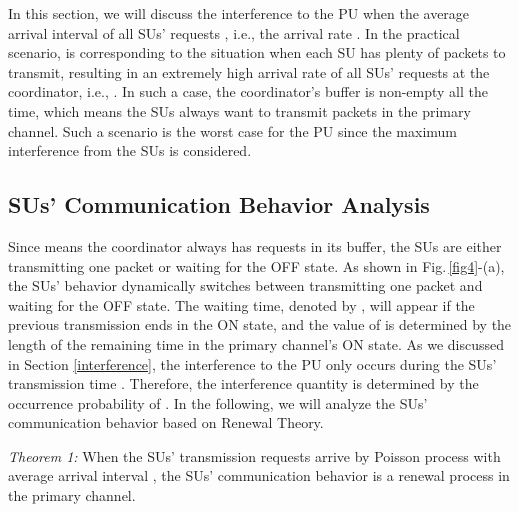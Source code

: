 \documentclass[11pt,draftcls]{IEEEtran}{\onecolumn}
\begin{document}
In this section, we will discuss the interference to the PU when the
average arrival interval of all SUs' requests , i.e.,
the arrival rate . In the practical
scenario,  is corresponding to the situation
when each SU has plenty of packets to transmit, resulting in an
extremely high arrival rate of all SUs' requests at the coordinator,
i.e., . In such a case, the
coordinator's buffer is non-empty all the time, which means the SUs
always want to transmit packets in the primary channel. Such a
scenario is the worst case for the PU since the maximum interference
from the SUs is considered.

\subsection{SUs' Communication Behavior Analysis}

Since  means the coordinator always has requests in its
buffer, the SUs are either transmitting one packet or waiting for
the OFF state. As shown in Fig.\,\ref{fig4}-(a), the SUs' behavior
dynamically switches between transmitting one packet and waiting for
the OFF state. The waiting time, denoted by , will appear if
the previous transmission ends in the ON state, and the value of
 is determined by the length of the remaining time in the
primary channel's ON state. As we discussed in Section
\ref{interference}, the interference to the PU only occurs during
the SUs' transmission time . Therefore, the interference
quantity is determined by the occurrence probability of . In
the following, we will analyze the SUs' communication behavior based
on Renewal Theory.

\emph{Theorem 1:} When the SUs' transmission requests arrive by
Poisson process with average arrival interval , the
SUs' communication behavior is a renewal process in the primary
channel.
\end{document}

